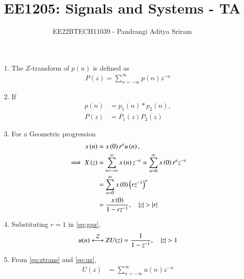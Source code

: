 \documentclass[journal,12pt,onecolumn]{IEEEtran}
\begin{document}
\let\vec\mathbf



\vspace{3cm}

\title{EE1205: Signals and Systems - TA}
\author{EE22BTECH11039 - Pandrangi Aditya Sriram}
\maketitle

\renewcommand{\thefigure}{\theenumi}
\renewcommand{\thetable}{\theenumi}

\begin{enumerate}
\item 
	The $Z$-transform of $p(n)$ is defined as
\begin{align}
P(z) = \sum_{n=-\infty}^{\infty}p(n)z^{-n}
\label{eq:ztrans}
\end{align}
\item If 
\begin{align}
	p(n) &= p_1(n)* p_2(n),
	\\
	P(z)&=P_1(z)P_2(z)
\label{eq:prodz}
\end{align}
\item For a Geometric progression 
\begin{align}
	       \label{eq:gpn}
	x\left(n\right) &=x\left(0\right)r^nu\left(n\right),
	\\
         \implies      X\left(z\right) &= \sum_{n=-\infty}^{\infty}x\left(n\right)z^{-n}
               =\sum_{n=0}^{\infty}x\left(0\right)r^nz^{-n}\\
                &=\sum_{n=0}^{\infty}x\left(0\right)\left(rz^{-1}\right)^n\\
               &= \frac{x\left(0\right)}{1-rz^{-1}}, \quad \left\vert z\right\vert>\left\vert r\right\vert 
	       \label{eq:gpz}
\end{align}
\item 	       Substituting $r = 1$ in \eqref{eq:gpz},
\begin{align}
	u(n) \overset{\mathcal{Z}}{\longleftrightarrow}{Z}	U(z) = 
                \frac{1}{1-z^{-1}}, \quad \left\vert z\right\vert>1
	       \label{eq:uz}
\end{align}
\item From 
\eqref{eq:ztrans}
	       and 
	       \eqref{eq:uz},
\begin{align}
	U(z) &= \sum_{n = -\infty}^{\infty} u(n) z^{-n} 

\end{align}
\end{enumerate}
\end{document}
